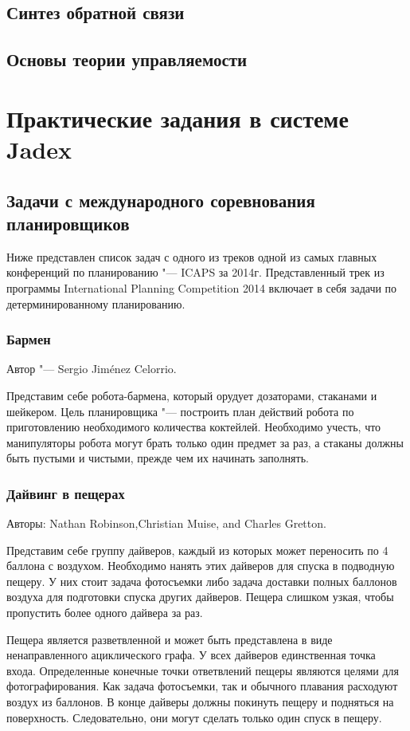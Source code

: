 \documentclass[b5paper,11pt]{book}
\begin{document}
	\section{Синтез обратной связи}
	\section{Основы теории управляемости}
	


	\chapter{Практические задания в системе Jadex}
	\section{Задачи с международного соревнования планировщиков}
	Ниже представлен список задач с одного из треков одной из самых главных конференций по планированию "--- ICAPS за 2014г. Представленный трек из программы International Planning Competition 2014 включает в себя задачи по детерминированному планированию.
	\subsection{Бармен}
	Автор "--- Sergio Jiménez Celorrio.
	
	Представим себе робота-бармена, который орудует дозаторами, стаканами и шейкером. Цель планировщика "--- построить план действий робота по приготовлению необходимого количества коктейлей. Необходимо учесть, что манипуляторы робота могут брать только один предмет за раз, а стаканы должны быть пустыми и чистыми, прежде чем их начинать заполнять.
	\subsection{Дайвинг в пещерах}
	Авторы: Nathan Robinson,Christian Muise, and Charles Gretton.
	
	Представим себе группу дайверов, каждый из которых может переносить по 4 баллона с воздухом. Необходимо нанять этих дайверов для спуска в подводную пещеру. У них стоит задача фотосъемки либо задача доставки полных баллонов воздуха для подготовки спуска других дайверов. Пещера слишком узкая, чтобы пропустить более одного дайвера за раз.
	
	Пещера является разветвленной и может быть представлена в виде ненаправленного ациклического графа. У всех дайверов единственная точка входа. Определенные конечные точки ответвлений пещеры являются целями для фотографирования. Как задача фотосъемки, так и обычного плавания расходуют воздух из баллонов. В конце дайверы должны покинуть пещеру и подняться на поверхность. Следовательно, они могут сделать только один спуск в пещеру.
	
\end{document}
